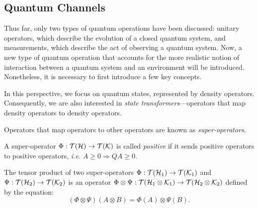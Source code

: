 


\subsection{Quantum Channels} \label{subsec:quantum_channels}


Thus far, only two types of quantum operations have been discussed: unitary operators, which describe the evolution of a closed quantum system, and measurements, which describe the act of observing a quantum system. Now, a new type of quantum operation that accounts for the more realistic notion of interaction between a quantum system and an environment will be introduced. Nonetheless, it is necessary to first introduce a few key concepts. 


\vspace{5pt}

In this perspective, we focus on quantum states, represented by density operators. Consequently, we are also interested in \emph{state transformers}---operators that map density operators to density operators.

\begin{definition}
 Operators that map operators to other operators are known as \emph{super-operators}. 
\end{definition}


\begin{definition} \label{def:positive_superoperator}
  A super-operator $\Phi: \mathcal{T}(\mathcal{H}) \to \mathcal{T}(\mathcal{K}) $ is called \emph{positive} if it sends positive operators to positive operators, \textit{i.e.} $A \geq 0 \Rightarrow{} Q A \geq 0$.
\end{definition}

\begin{definition}
  The tensor product of two super-operators 
  $\Phi: \mathcal{T}(\mathcal{H}_1) \rightarrow \mathcal{T}(\mathcal{K}_1) $ 
  and
  $\Psi : \mathcal{T}(\mathcal{H}_2) \rightarrow \mathcal{T}(\mathcal{K}_2)$ 
  is an operator 
  $ \Phi \otimes \Psi:  \mathcal{T}(\mathcal{H}_1 \otimes \mathcal{K}_1) \rightarrow \mathcal{T}(\mathcal{H}_2 \otimes \mathcal{K}_2)$ 
  defined by the equation:
\begin{equation*}
  (\Phi \otimes \Psi)(A \otimes B) = \Phi (A) \otimes \Psi(B).
\end{equation*}
\end{definition}

